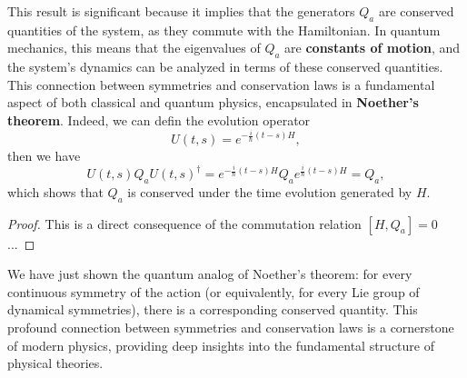 This result is significant because it implies that the generators \(Q_a\) are conserved quantities of the system, as they commute with the Hamiltonian. In quantum mechanics, this means that the eigenvalues of \(Q_a\) are \textbf{constants of motion}, and the system's dynamics can be analyzed in terms of these conserved quantities. This connection between symmetries and conservation laws is a fundamental aspect of both classical and quantum physics, encapsulated in \textbf{Noether's theorem}. Indeed, we can defin the evolution operator
\[
    U(t,s) = e^{-\tfrac{i}{\hbar}(t-s)H},
\]
then we have
\[
    U(t,s) Q_a U(t,s)^\dagger = e^{-\tfrac{i}{\hbar}(t-s)H} Q_a e^{\tfrac{i}{\hbar}(t-s)H} = Q_a,
\]
which shows that \(Q_a\) is conserved under the time evolution generated by \(H\).
\begin{proof}
    This is a direct consequence of the commutation relation \([H, Q_a] = 0\)...
\end{proof}
We have just shown the quantum analog of Noether's theorem: for every continuous symmetry of the action (or equivalently, for every Lie group of dynamical symmetries), there is a corresponding conserved quantity. This profound connection between symmetries and conservation laws is a cornerstone of modern physics, providing deep insights into the fundamental structure of physical theories.